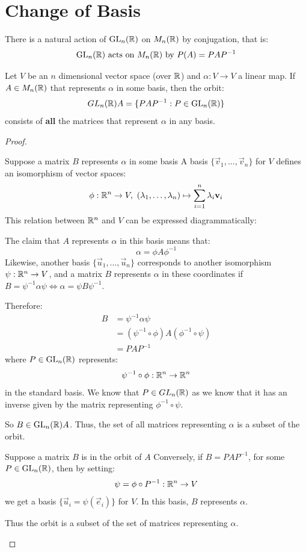 \documentclass[../main.tex]{subfiles}
\begin{document}
\section{Change of Basis}
There is a natural action of $\mathrm{GL}_n(\mathbb{R})$ on $M_n(\mathbb{R})$ by conjugation, that is:
\[
  \mathrm{GL}_n(\mathbb{R}) \text{ acts on } M_n(\mathbb{R}) \text{ by } P(A) = PAP^{-1}
\]
\begin{proposition}
  Let $V$ be an $n$ dimensional vector space (over $\mathbb{R}$) and $\alpha: V \to V$ a linear map.
  If $A \in M_n(\mathbb{R})$ that represents $\alpha$ in some basis, then the orbit:
  \[
    GL_n(\mathbb{R})A = \{PAP^{-1} : P \in \mathrm{GL}_n(\mathbb{R})\}
  \]
  consists of \textbf{all} the matrices that represent $\alpha$ in any basis.
\end{proposition}
\begin{proof}
  \begin{proofdirection}{Suppose a matrix $B$ represents $\alpha$ in some basis}
    A basis $\{\vec{v}_1, \ldots, \vec{v}_n\}$ for $V$ defines an isomorphism of vector spaces:
    \[
      \phi: \mathbb{R}^{n} \to V,\ (\lambda_1, \ldots, \lambda_n) \mapsto \sum_{i = 1}^{n} \lambda_i \mathbf{\bm{v}}_i
    \]
    This relation between $\mathbb{R}^{n}$ and $V$ can be expressed diagrammatically:
    \begin{center}
    \end{center}
    The claim that $A$ represents $\alpha$ in this basis means that:
    \[
      \alpha = \phi A \phi^{-1}
    \]
    Likewise, another basis  $\{\vec{u}_1, \ldots, \vec{u}_n\}$ corresponds to another isomorphism $\psi: \mathbb{R}^{n} \to V$, and a matrix $B$ represents $\alpha$ in these coordinates if $B = \psi^{-1} \alpha \psi \iff \alpha = \psi B \psi^{-1}$.

    Therefore:
    \begin{align*}
      B &= \psi^{-1} \alpha \psi \\
        &= (\psi^{-1} \circ \phi) A (\phi^{-1} \circ \psi) \\
        &= PAP^{-1}
    \end{align*}
    where $P \in \mathrm{GL}_n(\mathbb{R})$ represents:
    \[
      \psi^{-1} \circ \phi: \mathbb{R}^{n} \to \mathbb{R}^{n}
    \]
    in the standard basis.
    We know that $P \in GL_n(\mathbb{R})$ as we know that it has an inverse given by the matrix representing $\phi^{-1} \circ \psi$.

    So $B \in \mathrm{GL}_n(\mathbb{R})A$.
    Thus, the set of all matrices representing $\alpha$ is a subset of the orbit.
  \end{proofdirection}
  \begin{proofdirection}{Suppose a matrix $B$ is in the orbit of $A$}
    Conversely, if $B = PAP^{-1}$, for some $P \in \mathrm{GL}_n(\mathbb{R})$, then by setting:
    \[
      \psi = \phi \circ P^{-1}: \mathbb{R}^{n} \to V
    \]
    we get a basis $\{\vec{u}_i = \psi(\vec{e}_i)\}$ for $V$.
    In this basis, $B$ represents $\alpha$.

    Thus the orbit is a subset of the set of matrices representing $\alpha$.
  \end{proofdirection}
\end{proof}
\end{document}
